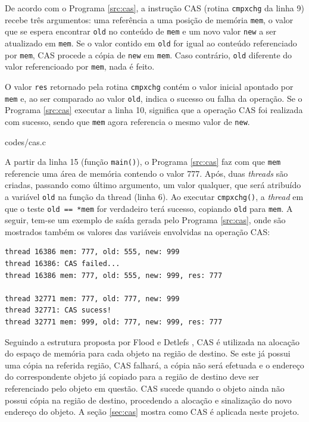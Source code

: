 \documentclass[ccc, pg2]{esinucpel}
\begin{document}
De acordo com o Programa \ref{src:cas}, a instrução CAS (rotina {\tt cmpxchg} da linha 9) recebe três argumentos: uma referência a uma posição de memória {\tt mem}, o valor que se espera encontrar {\tt old} no conteúdo de {\tt mem} e um novo valor {\tt new} a ser atualizado em {\tt mem}. Se o valor contido em {\tt old} for igual ao conteúdo referenciado por {\tt mem}, CAS procede a cópia de {\tt new} em {\tt mem}. Caso contrário, {\tt old} diferente do valor referencioado por {\tt mem}, nada é feito.

O valor {\tt res} retornado pela rotina {\tt cmpxchg} contém o valor inicial apontado por {\tt mem} e, ao ser comparado ao valor {\tt old}, indica o sucesso ou falha da operação. Se o Programa \ref{src:cas} executar a linha 10, significa que a operação CAS foi realizada com sucesso, sendo que {\tt mem} agora referencia o mesmo valor de {\tt new}.


								 {codes/cas.c}

A partir da linha 15 (função {\tt main()}), o Programa \ref{src:cas} faz com que {\tt mem} referencie uma área de memória contendo o valor 777. Após, duas {\it threads} são criadas, passando como último argumento, um valor qualquer, que será atribuído a variável {\tt old} na função da thread (linha 6). Ao executar {\tt cmpxchg()}, a {\it thread} em que o teste {\tt old == *mem} for verdadeiro terá sucesso, copiando {\tt old} para {\tt *mem}. A seguir, tem-se um exemplo de saída gerada pelo Programa \ref{src:cas}, onde são mostrados também os valores das variáveis envolvidas na operação CAS:
\begin{verbatim}
thread 16386 mem: 777, old: 555, new: 999
thread 16386: CAS failed...
thread 16386 mem: 777, old: 555, new: 999, res: 777

thread 32771 mem: 777, old: 777, new: 999
thread 32771: CAS sucess!
thread 32771 mem: 999, old: 777, new: 999, res: 777
\end{verbatim}

Seguindo a estrutura proposta por Flood e Detlefs \cite{bib:flood:pargc}, CAS é utilizada na alocação do espaço de memória para cada objeto na região de destino. Se este já possui uma cópia na referida região, CAS falhará, a cópia não será efetuada e o endereço do correspondente objeto já copiado para a região de destino deve ser referenciado pelo objeto em questão. CAS sucede quando o objeto ainda não possui cópia na região de destino, procedendo a alocação e sinalização do novo endereço do objeto. A seção \ref{sec:cas} mostra como CAS é aplicada neste projeto.
\end{document}

